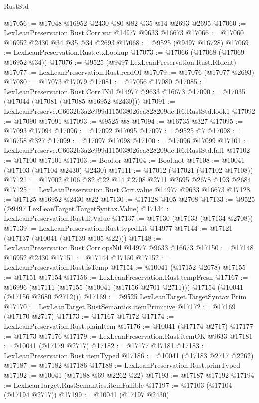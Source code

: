 \begin{lexlean}{RustStd}
\begin{coremodule}
@17056 := @17048 @16952 @2430 @80 @82 @35 @14 @2693 @2695
@17060 := LexLeanPreservation.Rust.Corr.var @14977 @9633 @16673
@17066 := @17060 @16952 @2430 @34 @35 @34 @2693
@17068 := @9525 (@9497 @16728)
@17069 := LexLeanPreservation.Rust.ctxLookup
@17073 := @17066 (@17068 (@17069 @16952 @34))
@17076 := @9525 (@9497 LexLeanPreservation.Rust.RIdent)
@17077 := LexLeanPreservation.Rust.readOf
@17079 := @17076 (@17077 @2693)
@17080 := @17073 @17079
@17081 := @17056 @17080
@17085 := LexLeanPreservation.Rust.Corr.lNil @14977 @9633 @16673
@17090 := @17035 (@17044 (@17081 (@17085 @16952 @2430)))
@17091 := LexLeanPreserve.C6632b3a2e999d115038026ca828209de.R6.RustStd.look1
@17092 := @17090 @17091
@17093 := @9525 @8
@17094 := @16735 @327
@17095 := @17093 @17094
@17096 := @17092 @17095
@17097 := @9525 @7
@17098 := @16758 @327
@17099 := @17097 @17098
@17100 := @17096 @17099
@17101 := LexLeanPreserve.C6632b3a2e999d115038026ca828209de.R6.RustStd.fal1
@17102 := @17100 @17101
@17103 := Bool.or
@17104 := Bool.not
@17108 := @10041 (@17103 (@17104 @2430) @2430)
@17111 := @17012 (@17021 (@17102 @17108))
@17121 := @17002 @106 @82 @22 @14 @2708 @2711 @2695 @2678 @193 @2684
@17125 := LexLeanPreservation.Rust.Corr.value @14977 @9633 @16673
@17128 := @17125 @16952 @2430 @22
@17130 := @17128 @105 @2708
@17133 := @9525 (@9497 LexLeanTarget.TargetSyntax.Value)
@17134 := LexLeanPreservation.Rust.litValue
@17137 := @17130 (@17133 (@17134 @2708))
@17139 := LexLeanPreservation.Rust.typedLit @14977
@17144 := @17121 (@17137 (@10041 (@17139 @105 @22)))
@17148 := LexLeanPreservation.Rust.Corr.opsNil @14977 @9633 @16673
@17150 := @17148 @16952 @2430
@17151 := @17144 @17150
@17152 := LexLeanPreservation.Rust.isTemp
@17154 := @10041 (@17152 @2678)
@17155 := @17151 @17154
@17156 := LexLeanPreservation.Rust.tempFresh
@17167 := @16996
    (@17111 (@17155 (@10041 (@17156 @2701 @2711))) @17154 (@10041 (@17156 @2680 @2712)))
@17169 := @9525 LexLeanTarget.TargetSyntax.Prim
@17170 := LexLeanTarget.RustSemantics.itemPrimitive
@17172 := @17169 (@17170 @2717)
@17173 := @17167 @17172
@17174 := LexLeanPreservation.Rust.plainItem
@17176 := @10041 (@17174 @2717)
@17177 := @17173 @17176
@17179 := LexLeanPreservation.Rust.itemOK @9633
@17181 := @10041 (@17179 @2717)
@17182 := @17177 @17181
@17183 := LexLeanPreservation.Rust.itemTyped
@17186 := @10041 (@17183 @2717 @2262)
@17187 := @17182 @17186
@17188 := LexLeanPreservation.Rust.primTyped
@17192 := @10041 (@17188 @69 @2262 @22)
@17193 := @17187 @17192
@17194 := LexLeanTarget.RustSemantics.itemFallible
@17197 := @17103 (@17104 (@17194 @2717))
@17199 := @10041 (@17197 @2430)

\end{coremodule}
\end{lexlean}
